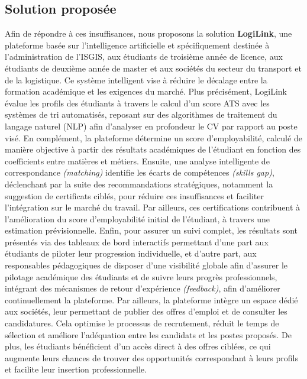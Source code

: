 \subsection{Solution proposée}

Afin de répondre à ces insuffisances, nous proposons la solution \textbf{LogiLink}, une plateforme basée sur l’intelligence artificielle et spécifiquement destinée à l’administration de l’ISGIS, aux étudiants de troisième année de licence, aux étudiants de deuxième année de master et aux sociétés du secteur du transport et de la logistique. Ce système intelligent vise à réduire le décalage entre la formation académique et les exigences du marché. Plus précisément, LogiLink évalue les profils des étudiants à travers le calcul d’un score ATS avec les systèmes de tri automatisés, reposant sur des algorithmes de traitement du langage naturel (NLP) afin d’analyser en profondeur le CV par rapport au poste visé. En complément, la plateforme détermine un score d’employabilité, calculé de manière objective à partir des résultats académiques de l'étudiant en fonction des coefficients entre matières et métiers.  Ensuite, une analyse intelligente de correspondance \textit{(matching)} identifie les écarts de compétences \textit{(skills gap)}, déclenchant par la suite des recommandations stratégiques, notamment la suggestion de certificats ciblés, pour réduire ces insuffisances et faciliter l’intégration sur le marché du travail. Par ailleurs, ces certifications contribuent à l’amélioration du score d’employabilité initial de l’étudiant, à travers une estimation prévisionnelle. Enfin, pour assurer un suivi complet, les résultats sont présentés via des tableaux de bord interactifs permettant d’une part aux étudiants de piloter leur progression individuelle, et d’autre part, aux responsables pédagogiques de disposer d’une visibilité globale afin d’assurer le pilotage académique des étudiants et de suivre leurs progrès professionnels, intégrant des mécanismes de retour d’expérience \textit{(feedback)}, afin d’améliorer continuellement la plateforme. Par ailleurs, la plateforme intègre un espace dédié aux sociétés, leur permettant de publier des offres d’emploi et de consulter les candidatures. Cela optimise le processus de recrutement, réduit le temps de sélection et améliore l’adéquation entre les candidats et les postes proposés. De plus, les étudiants bénéficient d’un accès direct à des offres ciblées, ce qui augmente leurs chances de trouver des opportunités correspondant à leurs profils et facilite leur insertion professionnelle.


